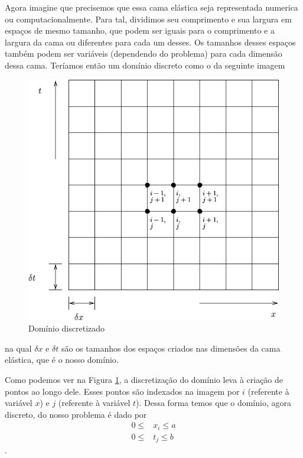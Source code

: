                 Agora imagine que precisemos que essa cama elástica seja representada numerica ou computacionalmente. Para tal, dividimos seu comprimento e sua largura em espaços de mesmo tamanho, que podem ser iguais para o comprimento e a largura da cama ou diferentes para cada um desses. Os tamanhos desses espaços também podem ser variáveis (dependendo do problema) para cada dimensão dessa cama. Teríamos então um domínio discreto como o da seguinte imagem
                \begin{figure}[H]
                    \label{fig:discreteDomain}
                    \centering \includegraphics[scale=.45]{imagens/ilustracoes/discretizationFDM.png}
                    \caption{Domínio discretizado \cite{discreteDomainFig}}
                    \label{fig:discreteFDM}
                \end{figure}
                na qual $\delta x$ e $\delta t$ são os tamanhos dos espaços criados nas dimensões da cama elástica, que é o nosso domínio.
                
                Como podemos ver na Figura \ref{fig:discreteFDM}, a discretização do domínio leva à criação de pontos ao longo dele. Esses pontos são indexados na imagem por $i$ (referente à variável $x$) e $j$ (referente à variável $t$). Dessa forma temos que o domínio, agora discreto, do nosso problema é dado por
                \begin{align*}
                    0 \leq  &x_i \leq a\\
                    0 \leq  &t_j \leq b
                \end{align*}.
                
